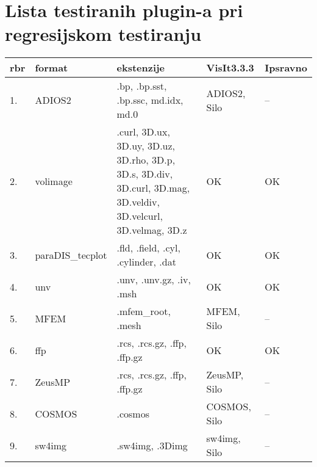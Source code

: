 \documentclass[times, utf8, zavrsni]{fer}
\begin{document}
\appendix
\chapter{Lista testiranih plugin-a pri regresijskom testiranju}
\begin{longtable}{|l|p{70pt}|p{100pt}|p{100pt}| p{100pt}|}
	\hline
	rbr & format & ekstenzije & VisIt3.3.3 & Ipsravno\\
	\hline
	\endhead %
	1. & ADIOS2 & .bp, .bp.sst, .bp.ssc, md.idx, md.0 & ADIOS2, Silo & --\\
	\hline
	2. & volimage & .curl, 3D.ux, 3D.uy, 3D.uz, 3D.rho, 3D.p, 3D.s, 3D.div, 3D.curl, 3D.mag, 3D.veldiv, 3D.velcurl, 3D.velmag, 3D.z & OK & OK\\
	\hline
	3. & paraDIS\_tecplot & .fld, .field, .cyl, .cylinder, .dat & OK & OK\\
	\hline
	4. & unv & .unv, .unv.gz, .iv, .msh & OK & OK\\
	\hline
	5. & MFEM & .mfem_root, .mesh & MFEM, Silo & --\\
	\hline
	6. & ffp & .rcs, .rcs.gz, .ffp, .ffp.gz & OK & OK\\
	\hline
	7. & ZeusMP & .rcs, .rcs.gz, .ffp, .ffp.gz & ZeusMP, Silo & --\\
	\hline
	8. & COSMOS & .cosmos & COSMOS, Silo & --\\
	\hline
	9. & sw4img & .sw4img, .3Dimg & sw4img, Silo & --\\
	\hline
\end{longtable}
\end{document}
